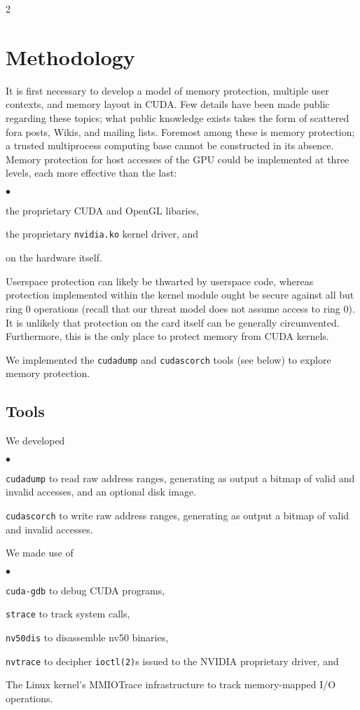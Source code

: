 \documentclass[letterpaper,10pt]{article}
\newcommand{\squishlist}{\begin{list}{$\bullet$}
  {\setlength{\itemsep}{0pt}
    \setlength{\parsep}{3pt}
    \setlength{\topsep}{3pt}
    \setlength{\partopsep}{0pt}
    \setlength{\leftmargin}{1.5em}
    \setlength{\labelwidth}{1em}
    \setlength{\labelsep}{0.5em}
  } }
\newcommand{\squishend}{\end{list}}
\begin{document}
\begin{multicols}{2}
\section{Methodology}
It is first necessary to develop a model of memory protection, multiple user
contexts, and memory layout in CUDA. Few details have been made public
regarding these topics; what public knowledge exists takes the form of
scattered fora posts, Wikis\cite{nouveaucuda}, and mailing lists. Foremost among these is memory
protection; a trusted multiprocess computing base cannot be constructed in its
absence. Memory protection for host accesses of the GPU could be implemented at
three levels, each more effective than the last:
\squishlist
\item the proprietary CUDA and OpenGL libaries,
\item the proprietary \texttt{nvidia.ko} kernel driver, and
\item on the hardware itself.
\squishend
Userspace protection can likely be thwarted by userspace code, whereas
protection implemented within the kernel module ought be secure against
all but ring 0 operations (recall that our threat model does not assume access
to ring 0). It is unlikely that protection on the card itself can be generally
circumvented. Furthermore, this is the only place to protect memory from CUDA
kernels.

We implemented the \texttt{cudadump} and
\texttt{cudascorch} tools (see below)%
to explore memory protection.

\subsection{Tools}
We developed
\squishlist
\item \texttt{cudadump} to read raw address ranges, generating as output a
bitmap of valid and invalid accesses, and an optional disk image.
\item \texttt{cudascorch} to write raw address ranges, generating as output a
bitmap of valid and invalid accesses.
\squishend
We made use of
\squishlist
\item \texttt{cuda-gdb}\cite{cudagdb} to debug CUDA programs,
\item \texttt{strace}\cite{stracecode} to track system calls,
\item \texttt{nv50dis}\cite{nv50dis} to disassemble nv50 binaries,
\item \texttt{nvtrace}\cite{nvtrace} to decipher \texttt{ioctl(2)}s
issued to the NVIDIA proprietary driver, and
\item The Linux kernel's MMIOTrace\cite{mmiotrace}
infrastructure to track memory-mapped I/O operations.
\squishend


\end{multicols}
\end{document}
